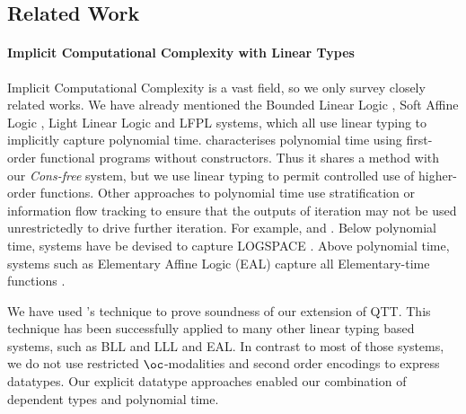 \documentclass[acmsmall,screen]{acmart}
\begin{document}
\subsection{Related Work}

\paragraph{Implicit Computational Complexity with Linear Types}
Implicit Computational Complexity \cite{Lago11} is a vast field, so we
only survey closely related works. We have already mentioned the
Bounded Linear Logic \cite{bll92}, Soft Affine Logic \cite{Lafont04},
Light Linear Logic \cite{lll98} and LFPL \cite{hofmann99lfpl} systems,
which all use linear typing to implicitly capture polynomial
time. \citet{Jones01} characterises polynomial time using first-order
functional programs without constructors. Thus it shares a method with
our \emph{Cons-free} system, but we use linear typing to permit
controlled use of higher-order functions. Other approaches to
polynomial time use stratification or information flow tracking to
ensure that the outputs of iteration may not be used unrestrictedly to
drive further iteration. For example, \cite{BellantoniC92} and
\cite{HainryP23}. Below polynomial time, systems have be devised to
capture LOGSPACE \cite{LagoS16}. Above polynomial time, systems such
as Elementary Affine Logic (EAL) capture all Elementary-time functions
\cite{CoppolaM01}.

We have used \citet{dallago11realisability}'s technique to prove
soundness of our extension of QTT. This technique has been
successfully applied to many other linear typing based systems, such
as BLL \cite{hofmann04bll-realisability,dallago10bll} and LLL
\cite{LagoH10} and EAL. In contrast to most of those systems, we do
not use restricted $\oc$-modalities and second order encodings to
express datatypes. Our explicit datatype approaches enabled our
combination of dependent types and polynomial time.
\end{document}
